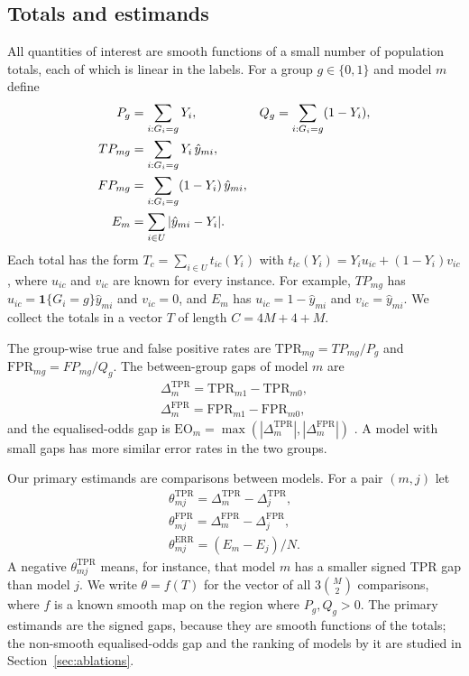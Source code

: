 \documentclass[pdflatex,sn-mathphys-num,iicol]{sn-jnl}
\theoremstyle{thmstyleone}
\theoremstyle{thmstyletwo}
\theoremstyle{thmstylethree}
\begin{document}
\subsection{Totals and estimands}
All quantities of interest are smooth functions of a small number of population totals, each of which is linear in the labels. For a group $g\in\{0,1\}$ and model $m$ define
\begin{align}
P_g &= \sum_{i:G_i=g} Y_i, & Q_g &= \sum_{i:G_i=g} (1-Y_i),\label{eq:PQ}\\
TP_{mg} &= \sum_{i:G_i=g} Y_i\,\hat y_{mi},\notag\\
FP_{mg} &= \sum_{i:G_i=g} (1-Y_i)\,\hat y_{mi},\notag\\
E_m &= \sum_{i\in U}|\hat y_{mi}-Y_i|.\label{eq:TPFP}
\end{align}
Each total has the form $T_c=\sum_{i\in U} t_{ic}(Y_i)$ with $t_{ic}(Y_i)=Y_i u_{ic}+(1-Y_i)v_{ic}$, where $u_{ic}$ and $v_{ic}$ are known for every instance. For example, $TP_{mg}$ has $u_{ic}=\mathbf 1\{G_i=g\}\hat y_{mi}$ and $v_{ic}=0$, and $E_m$ has $u_{ic}=1-\hat y_{mi}$ and $v_{ic}=\hat y_{mi}$. We collect the totals in a vector $T$ of length $C=4M+4+M$.

The group-wise true and false positive rates are $\mathrm{TPR}_{mg}=TP_{mg}/P_g$ and $\mathrm{FPR}_{mg}=FP_{mg}/Q_g$. The between-group gaps of model $m$ are
\begin{equation}
\begin{gathered}
\Delta^{\mathrm{TPR}}_m=\mathrm{TPR}_{m1}-\mathrm{TPR}_{m0},\\
\Delta^{\mathrm{FPR}}_m=\mathrm{FPR}_{m1}-\mathrm{FPR}_{m0},
\end{gathered}
\end{equation}
and the equalised-odds gap is $\mathrm{EO}_m=\max(|\Delta^{\mathrm{TPR}}_m|,|\Delta^{\mathrm{FPR}}_m|)$ \citep{hardt2016}. A model with small gaps has more similar error rates in the two groups.

Our primary estimands are comparisons between models. For a pair $(m,j)$ let
\begin{equation}\label{eq:theta}
\begin{gathered}
\theta^{\mathrm{TPR}}_{mj}=\Delta^{\mathrm{TPR}}_m-\Delta^{\mathrm{TPR}}_j,\\
\theta^{\mathrm{FPR}}_{mj}=\Delta^{\mathrm{FPR}}_m-\Delta^{\mathrm{FPR}}_j,\\
\theta^{\mathrm{ERR}}_{mj}=(E_m-E_j)/N .
\end{gathered}
\end{equation}
A negative $\theta^{\mathrm{TPR}}_{mj}$ means, for instance, that model $m$ has a smaller signed TPR gap than model $j$. We write $\theta=f(T)$ for the vector of all $3\binom{M}{2}$ comparisons, where $f$ is a known smooth map on the region where $P_g,Q_g>0$. The primary estimands are the signed gaps, because they are smooth functions of the totals; the non-smooth equalised-odds gap and the ranking of models by it are studied in Section~\ref{sec:ablations}.
\end{document}
